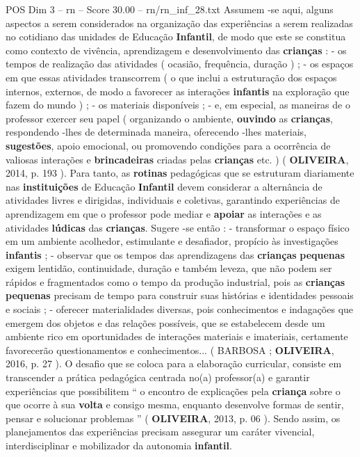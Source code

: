 \begin{textsample}{POS Dim 3 – rn – Score 30.00 – rn/rn\_inf\_28.txt}
Assumem -se aqui, alguns aspectos a serem considerados na organização das experiências a serem realizadas no cotidiano das unidades de Educação \textbf{Infantil}, de modo que este se constitua como contexto de vivência, aprendizagem e desenvolvimento das \textbf{crianças} : - os tempos de realização das atividades ( ocasião, frequência, duração ) ; - os espaços em que essas atividades transcorrem ( o que inclui a estruturação dos espaços internos, externos, de modo a favorecer as interações \textbf{infantis} na exploração que fazem do mundo ) ; - os materiais disponíveis ; - e, em especial, as maneiras de o professor exercer seu papel ( organizando o ambiente, \textbf{ouvindo} as \textbf{crianças}, respondendo -lhes de determinada maneira, oferecendo -lhes materiais, \textbf{sugestões}, apoio emocional, ou promovendo condições para a ocorrência de valiosas interações e \textbf{brincadeiras} criadas pelas \textbf{crianças} etc. ) ( \textbf{OLIVEIRA}, 2014, p. 193 ).
Para tanto, as \textbf{rotinas} pedagógicas que se estruturam diariamente nas \textbf{instituições} de Educação \textbf{Infantil} devem considerar a alternância de atividades livres e dirigidas, individuais e coletivas, garantindo experiências de aprendizagem em que o professor pode mediar e \textbf{apoiar} as interações e as atividades \textbf{lúdicas} das \textbf{crianças}.
Sugere -se então : - transformar o espaço físico em um ambiente acolhedor, estimulante e desafiador, propício às investigações \textbf{infantis} ; - observar que os tempos das aprendizagens das \textbf{crianças} \textbf{pequenas} exigem lentidão, continuidade, duração e também leveza, que não podem ser rápidos e fragmentados como o tempo da produção industrial, pois as \textbf{crianças} \textbf{pequenas} precisam de tempo para construir suas histórias e identidades pessoais e sociais ; - oferecer materialidades diversas, pois conhecimentos e indagações que emergem dos objetos e das relações possíveis, que se estabelecem desde um ambiente rico em oportunidades de interações materiais e imateriais, certamente favorecerão questionamentos e conhecimentos... ( BARBOSA ; \textbf{OLIVEIRA}, 2016, p. 27 ).
O desafio que se coloca para a elaboração curricular, consiste em transcender a prática pedagógica centrada no(a) professor(a) e garantir experiências que possibilitem “ o encontro de explicações pela \textbf{criança} sobre o que ocorre à sua \textbf{volta} e consigo mesma, enquanto desenvolve formas de sentir, pensar e solucionar problemas ” ( \textbf{OLIVEIRA}, 2013, p. 06 ).
Sendo assim, os planejamentos das experiências precisam assegurar um caráter vivencial, interdisciplinar e mobilizador da autonomia \textbf{infantil}.

\end{textsample}
